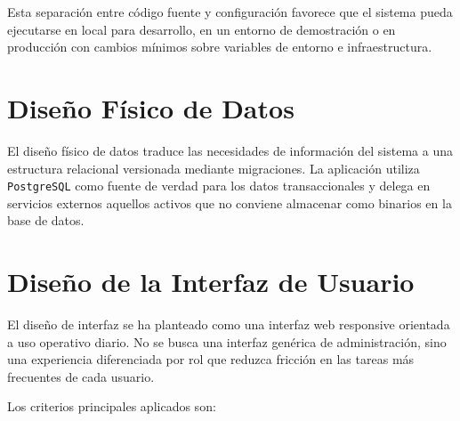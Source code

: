 Esta separación entre código fuente y configuración favorece que el sistema pueda ejecutarse en local para desarrollo, en un entorno de demostración o en producción con cambios mínimos sobre variables de entorno e infraestructura.

\section{Diseño Físico de Datos}
\label{sec:storageDesign}

El diseño físico de datos traduce las necesidades de información del sistema a una estructura relacional versionada mediante migraciones. La aplicación utiliza \texttt{PostgreSQL} como fuente de verdad para los datos transaccionales y delega en servicios externos aquellos activos que no conviene almacenar como binarios en la base de datos.



\section{Diseño de la Interfaz de Usuario} 
El diseño de interfaz se ha planteado como una interfaz web responsive orientada a uso operativo diario. No se busca una interfaz genérica de administración, sino una experiencia diferenciada por rol que reduzca fricción en las tareas más frecuentes de cada usuario.

Los criterios principales aplicados son:

